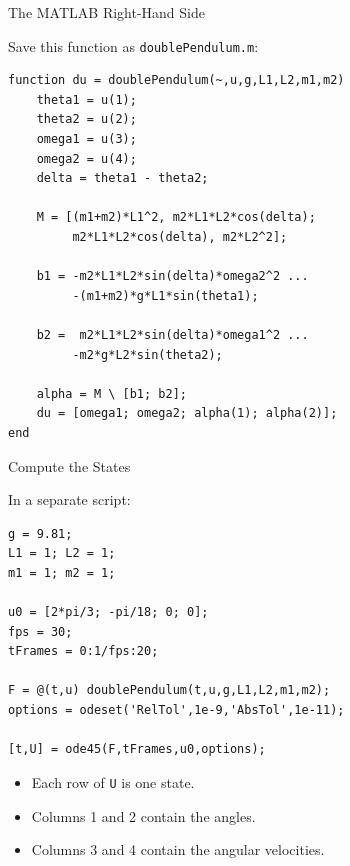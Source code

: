 \documentclass[10pt]{beamer}
\begin{document}
\begin{frame}[fragile]{The MATLAB Right-Hand Side}

Save this function as \texttt{doublePendulum.m}:

\begin{lstlisting}[basicstyle=\ttfamily\scriptsize]
function du = doublePendulum(~,u,g,L1,L2,m1,m2)
    theta1 = u(1);
    theta2 = u(2);
    omega1 = u(3);
    omega2 = u(4);
    delta = theta1 - theta2;

    M = [(m1+m2)*L1^2, m2*L1*L2*cos(delta);
         m2*L1*L2*cos(delta), m2*L2^2];

    b1 = -m2*L1*L2*sin(delta)*omega2^2 ...
         -(m1+m2)*g*L1*sin(theta1);

    b2 =  m2*L1*L2*sin(delta)*omega1^2 ...
         -m2*g*L2*sin(theta2);

    alpha = M \ [b1; b2];
    du = [omega1; omega2; alpha(1); alpha(2)];
end
\end{lstlisting}

\end{frame}

\begin{frame}[fragile]{Compute the States}

In a separate script:

\begin{lstlisting}[basicstyle=\ttfamily\small]
g = 9.81;
L1 = 1; L2 = 1;
m1 = 1; m2 = 1;

u0 = [2*pi/3; -pi/18; 0; 0];
fps = 30;
tFrames = 0:1/fps:20;

F = @(t,u) doublePendulum(t,u,g,L1,L2,m1,m2);
options = odeset('RelTol',1e-9,'AbsTol',1e-11);

[t,U] = ode45(F,tFrames,u0,options);
\end{lstlisting}

\begin{itemize}
    \item Each row of \texttt{U} is one state.
    \item Columns 1 and 2 contain the angles.
    \item Columns 3 and 4 contain the angular velocities.
\end{itemize}


\end{frame}
\end{document}
